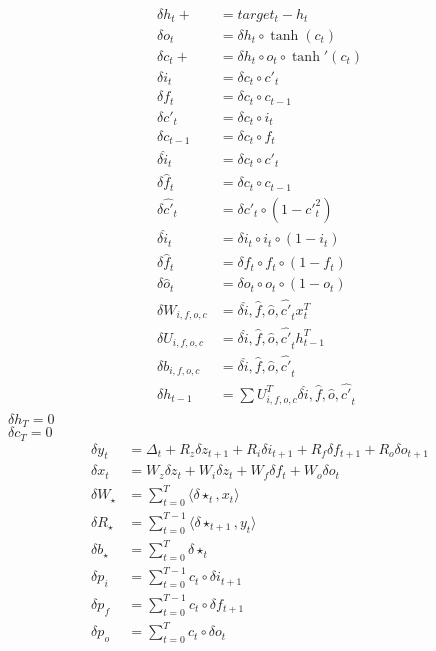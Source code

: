 \documentclass[letterpaper]{article}
\begin{document}
\begin{equation}
\begin{aligned}
\delta h_t +&= target_t - h_t\\
\delta o_t &= \delta h_t \circ \tanh (c_t)\\
\delta c_t +&= \delta h_t \circ o_t \circ \tanh' (c_t)\\
\delta i_t &= \delta c_t \circ c'_t\\
\delta f_t &= \delta c_t \circ c_{t-1}\\
\delta c'_t &= \delta c_t \circ i_t\\
\delta c_{t-1} &= \delta c_t \circ f_t\\
\delta \hat{i}_t &= \delta c_t \circ c'_t\\
\delta \hat{f}_t &= \delta c_t \circ c_{t-1}\\
\delta \hat{c'}_t &= \delta c'_t \circ (1 - c'^2_t)\\
\delta \hat{i}_t &= \delta i_t \circ i_t \circ (1-i_t)\\
\delta \hat{f}_t &= \delta f_t \circ f_t \circ (1-f_t)\\
\delta \hat{o}_t &= \delta o_t \circ o_t \circ (1-o_t)\\
\delta W_{i,f,o,c} &= \delta {\hat{i},\hat{f},\hat{o},\hat{c'}}_t x^T_t\\
\delta U_{i,f,o,c} &= \delta {\hat{i},\hat{f},\hat{o},\hat{c'}}_t h^T_{t-1}\\
\delta b_{i,f,o,c} &= \delta {\hat{i},\hat{f},\hat{o},\hat{c'}}_t\\
\delta h_{t-1} &= \sum U_{i,f,o,c}^T\delta {\hat{i},\hat{f},\hat{o},\hat{c'}}_t\\
\end{aligned}
\end{equation}
$\delta h_{T} = 0$\\
$\delta c_{T} = 0$\\

\begin{equation}
\begin{aligned}
\delta y_t &= \Delta_t + R_z\delta z_{t+1} + R_i\delta i_{t+1} + R_f\delta f_{t+1} + R_o\delta o_{t+1}\\
\delta x_t &= W_z\delta z_{t} + W_i\delta z_{t} + W_f\delta f_{t} + W_o\delta o_{t}\\
\delta W_{\star} &= \sum\nolimits^T_{t=0} \langle \delta\star_t,x_t\rangle\\
\delta R_{\star} &= \sum\nolimits^{T-1}_{t=0} \langle \delta\star_{t+1},y_t\rangle\\
\delta b_{\star} &= \sum\nolimits^{T}_{t=0} \delta\star_{t}\\
\delta p_{i} &= \sum\nolimits^{T-1}_{t=0} c_t \circ \delta i_{t+1}\\
\delta p_{f} &= \sum\nolimits^{T-1}_{t=0} c_t \circ \delta f_{t+1}\\
\delta p_{o} &= \sum\nolimits^{T}_{t=0} c_t \circ \delta o_{t}\\
\end{aligned}
\end{equation}
\end{document}
